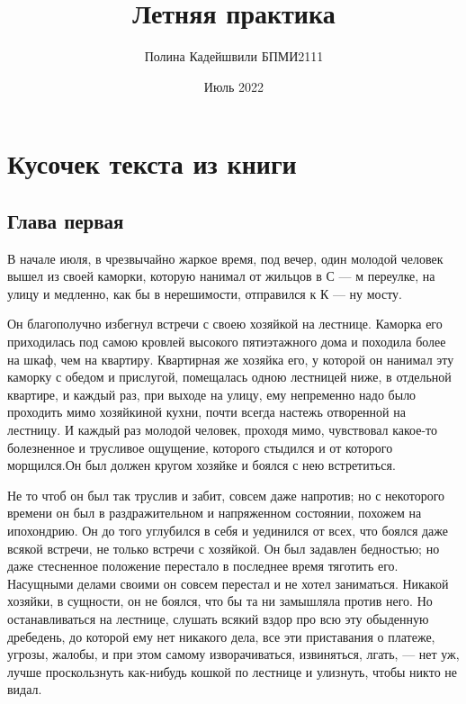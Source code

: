 \documentclass[10pt,a4paper]{report}
\title{Летняя практика}
\author{Полина Кадейшвили БПМИ2111}
\date{Июль 2022}
\begin{document}
\maketitle

\tableofcontents 
\chapter{Кусочек текста из книги}
\section{Глава первая}
В начале июля, в чрезвычайно жаркое время, под вечер, один молодой человек вышел из своей каморки, которую нанимал от жильцов в С — м переулке, на улицу и медленно, как бы в нерешимости, отправился к К — ну мосту.


Он благополучно избегнул встречи с своею хозяйкой на лестнице. Каморка его приходилась под самою кровлей высокого пятиэтажного дома и походила более на шкаф, чем на квартиру. Квартирная же хозяйка его, у которой он нанимал эту каморку с обедом и прислугой, помещалась одною лестницей ниже, в отдельной квартире, и каждый раз, при выходе на улицу, ему непременно надо было проходить мимо хозяйкиной кухни, почти всегда настежь отворенной на лестницу. И каждый раз молодой человек, проходя мимо, чувствовал какое-то болезненное и трусливое ощущение, которого стыдился и от которого морщился.Он был должен кругом хозяйке и боялся с нею встретиться.


Не то чтоб он был так труслив и забит, совсем даже напротив; но с некоторого времени он был в раздражительном и напряженном состоянии, похожем на ипохондрию. Он до того углубился в себя и уединился от всех, что боялся даже всякой встречи, не только встречи с хозяйкой. Он был задавлен бедностью; но даже стесненное положение перестало в последнее время тяготить его. Насущными делами своими он совсем перестал и не хотел заниматься. Никакой хозяйки, в сущности, он не боялся, что бы та ни замышляла против него. Но останавливаться на лестнице, слушать всякий вздор про всю эту обыденную дребедень, до которой ему нет никакого дела, все эти приставания о платеже, угрозы, жалобы, и при этом самому изворачиваться, извиняться, лгать, — нет уж, лучше проскользнуть как-нибудь кошкой по лестнице и улизнуть, чтобы никто не видал.
\end{document}

